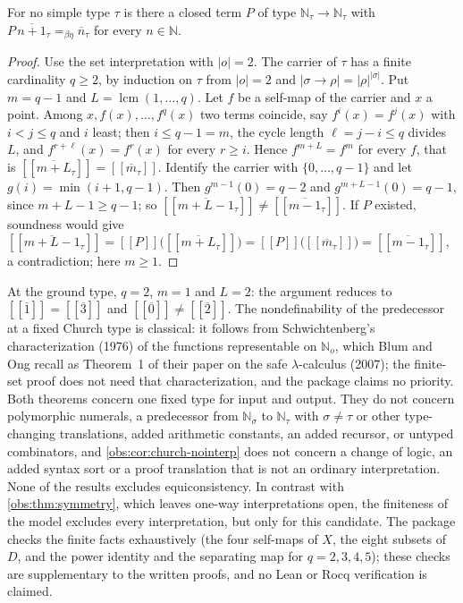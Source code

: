 \begin{theorem}
\label{obs:thm:church-pred}
For no simple type $\tau$ is there a closed term $P$ of type
$\mathbb{N}_\tau\to\mathbb{N}_\tau$ with
$P\,\overline{n+1}_\tau=_{\beta\eta}\overline{n}_\tau$ for every
$n\in\mathbb{N}$.
\end{theorem}

\begin{proof}
Use the set interpretation with $|o|=2$. The carrier of $\tau$ has a finite
cardinality $q\ge 2$, by induction on $\tau$ from $|o|=2$ and
$|\sigma\to\rho|=|\rho|^{|\sigma|}$. Put $m=q-1$ and
$L=\operatorname{lcm}(1,\dots,q)$. Let $f$ be a self-map of the carrier and $x$
a point. Among $x,f(x),\dots,f^{q}(x)$ two terms coincide, say
$f^{i}(x)=f^{j}(x)$ with $i<j\le q$ and $i$ least; then $i\le q-1=m$, the cycle
length $\ell=j-i\le q$ divides $L$, and $f^{r+\ell}(x)=f^{r}(x)$ for every
$r\ge i$. Hence $f^{m+L}=f^{m}$ for every $f$, that is
$[\![\overline{m+L}_\tau]\!]=[\![\overline{m}_\tau]\!]$. Identify the carrier
with $\{0,\dots,q-1\}$ and let $g(i)=\min(i+1,q-1)$. Then
$g^{m-1}(0)=q-2$ and $g^{m+L-1}(0)=q-1$, since $m+L-1\ge q-1$; so
$[\![\overline{m+L-1}_\tau]\!]\ne[\![\overline{m-1}_\tau]\!]$. If $P$ existed,
soundness would give
$[\![\overline{m+L-1}_\tau]\!]=[\![P]\!]\bigl([\![\overline{m+L}_\tau]\!]\bigr)
=[\![P]\!]\bigl([\![\overline{m}_\tau]\!]\bigr)=[\![\overline{m-1}_\tau]\!]$,
a contradiction; here $m\ge 1$.
\end{proof}

\begin{remark}[Scope]
\label{obs:rem:church-scope}
At the ground type, $q=2$, $m=1$ and $L=2$: the argument reduces to
$[\![\overline{1}]\!]=[\![\overline{3}]\!]$ and
$[\![\overline{0}]\!]\ne[\![\overline{2}]\!]$. The nondefinability of the
predecessor at a fixed Church type is classical: it follows from
Schwichtenberg's characterization (1976) of the functions representable on
$\mathbb{N}_o$, which Blum and Ong recall as Theorem~1 of their paper on the
safe $\lambda$-calculus (2007); the finite-set proof does not need that
characterization, and the package claims no priority. Both theorems concern
one fixed type for input and output. They do not concern polymorphic numerals,
a predecessor from $\mathbb{N}_\sigma$ to $\mathbb{N}_\tau$ with
$\sigma\ne\tau$ or other type-changing translations, added arithmetic
constants, an added recursor, or untyped combinators, and
\cref{obs:cor:church-nointerp} does not concern a change of logic, an added
syntax sort or a proof translation that is not an ordinary interpretation.
None of the results excludes equiconsistency. In contrast with
\cref{obs:thm:symmetry}, which leaves one-way interpretations open, the
finiteness of the model excludes every interpretation, but only for this
candidate. The package checks the finite facts exhaustively (the four
self-maps of $X$, the eight subsets of $D$, and the power identity and the
separating map for $q=2,3,4,5$); these checks are supplementary to the written
proofs, and no Lean or Rocq verification is claimed.
\end{remark}

